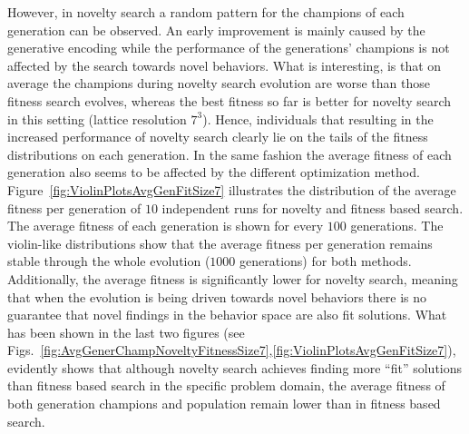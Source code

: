 However, in novelty search a random pattern for the champions of each generation can be observed. An early improvement is mainly caused by the generative encoding while the performance of the generations' champions is not affected by the search towards novel behaviors. What is interesting, is that on average the champions during novelty search evolution are worse than those fitness search evolves, whereas the best fitness so far is better for novelty search in this setting (lattice resolution $7^3$). Hence, individuals that resulting in the increased performance of novelty search clearly lie on the tails of the fitness distributions on each generation. In the same fashion the average fitness of each generation also seems to be affected by the different optimization method. Figure~\ref{fig:ViolinPlotsAvgGenFitSize7} illustrates the distribution of the average fitness per generation of $10$ independent runs for novelty and fitness based search. The average fitness of each generation is shown for every $100$ generations. The violin-like distributions show that the average fitness per generation remains stable through the whole evolution ($1000$ generations) for both methods. Additionally, the average fitness is significantly lower for novelty search, meaning that when the evolution is being driven towards novel behaviors there is no guarantee that novel findings in the behavior space are also fit solutions. What has been shown in the last two figures (see Figs.~\ref{fig:AvgGenerChampNoveltyFitnessSize7},\ref{fig:ViolinPlotsAvgGenFitSize7}), evidently shows that although novelty search achieves finding more ``fit'' solutions than fitness based search in the specific problem domain, the average fitness of both generation champions and population remain lower than in fitness based search.


